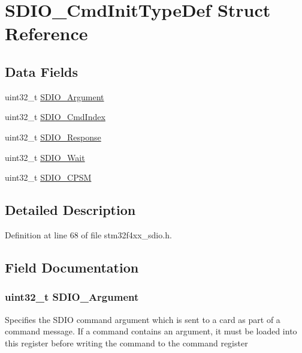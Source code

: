 \hypertarget{struct_s_d_i_o___cmd_init_type_def}{\section{S\-D\-I\-O\-\_\-\-Cmd\-Init\-Type\-Def Struct Reference}
\label{struct_s_d_i_o___cmd_init_type_def}
}
\subsection*{Data Fields}
\begin{DoxyCompactItemize}
\item 
uint32\-\_\-t \hyperlink{struct_s_d_i_o___cmd_init_type_def_ab40e564f8fc0dcbf89ce34beb325d774}{S\-D\-I\-O\-\_\-\-Argument}
\item 
uint32\-\_\-t \hyperlink{struct_s_d_i_o___cmd_init_type_def_a8b55bd6b004ba9105f153e0147fbaa25}{S\-D\-I\-O\-\_\-\-Cmd\-Index}
\item 
uint32\-\_\-t \hyperlink{struct_s_d_i_o___cmd_init_type_def_aeff6d745f123c5f75fd094a856426aae}{S\-D\-I\-O\-\_\-\-Response}
\item 
uint32\-\_\-t \hyperlink{struct_s_d_i_o___cmd_init_type_def_afd47828b3053d2c3bf582fe8d092ab27}{S\-D\-I\-O\-\_\-\-Wait}
\item 
uint32\-\_\-t \hyperlink{struct_s_d_i_o___cmd_init_type_def_a67da149308b7fcafddd7b3d62513845f}{S\-D\-I\-O\-\_\-\-C\-P\-S\-M}
\end{DoxyCompactItemize}


\subsection{Detailed Description}


Definition at line 68 of file stm32f4xx\-\_\-sdio.\-h.



\subsection{Field Documentation}
\hypertarget{struct_s_d_i_o___cmd_init_type_def_ab40e564f8fc0dcbf89ce34beb325d774}{
\subsubsection[{S\-D\-I\-O\-\_\-\-Argument}]{\setlength{\rightskip}{0pt plus 5cm}uint32\-\_\-t S\-D\-I\-O\-\_\-\-Argument}}\label{struct_s_d_i_o___cmd_init_type_def_ab40e564f8fc0dcbf89ce34beb325d774}
Specifies the S\-D\-I\-O command argument which is sent to a card as part of a command message. If a command contains an argument, it must be loaded into this register before writing the command to the command register 

